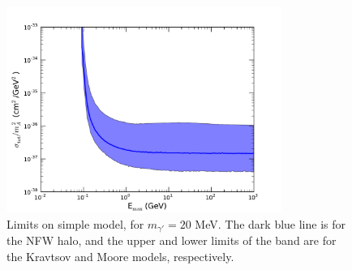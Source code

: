 \begin{figure}
\includegraphics[width=0.8\textwidth]{figures/limits_mg_20MeV_toymc_new.pdf}
\caption{Limits on simple model, for $m_{\gamma '}=20$ MeV.  The dark blue line is for the NFW halo, and the upper and lower limits of the band are for the Kravtsov and Moore models, respectively.}
\label{fig:limits_on_model}
\end{figure}

